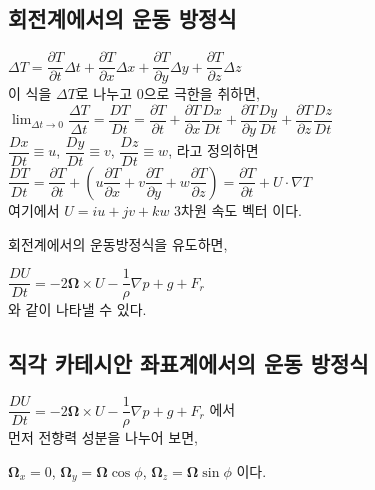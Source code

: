 \subsection{회전계에서의 운동 방정식}


$ \Delta T = \dfrac{\partial T}{\partial t} \Delta t 
+ \dfrac{\partial T}{\partial x} \Delta x 
+ \dfrac{\partial T}{\partial y} \Delta y 
+ \dfrac{\partial T}{\partial z} \Delta z $\\

이 식을 $ \Delta T $로 나누고 0으로 극한을 취하면,\\

$ \displaystyle \lim_{\Delta t \rightarrow 0} \dfrac{\Delta T}{\Delta t} 
= \dfrac{DT}{Dt} = \dfrac{\partial T}{\partial t} 
+ \dfrac{\partial T}{\partial x} \dfrac{Dx}{Dt}
+ \dfrac{\partial T}{\partial y} \dfrac{Dy}{Dt}
+ \dfrac{\partial T}{\partial z} \dfrac{Dz}{Dt} $\\

$\dfrac{Dx}{Dt} \equiv u$, 
$\dfrac{Dy}{Dt} \equiv v$, 
$\dfrac{Dz}{Dt} \equiv w$, 
 라고 정의하면\\

$ \dfrac{DT}{Dt} = \dfrac{\partial T}{\partial t} 
+ \left( u \dfrac{\partial T}{\partial x}
+ v \dfrac{\partial T}{\partial y}
+ w \dfrac{\partial T}{\partial z} \right)
= \dfrac{\partial T}{\partial t} + U \cdot \nabla T $\\

여기에서 $ U = iu + jv + kw $ 3차원 속도 벡터 이다.

회전계에서의 운동방정식을 유도하면,

$ \dfrac{DU}{Dt} = -2 \mathbf {\Omega} \times U - \dfrac{1}{\rho} \nabla p + g + F_{r} $\\

와 같이 나타낼 수 있다.



\subsection{직각 카테시안 좌표계에서의 운동 방정식}

$ \dfrac{DU}{Dt} = -2 \mathbf {\Omega} \times U - \dfrac{1}{\rho} \nabla p + g + F_{r} $ 에서 \\

먼저 전향력 성분을 나누어 보면, 

$ \mathbf {\Omega}_{x} = 0$,
$ \mathbf {\Omega}_{y} = \mathbf {\Omega} \cos \phi$, 
$ \mathbf {\Omega}_{z} = \mathbf {\Omega} \sin \phi$ 이다.\\

